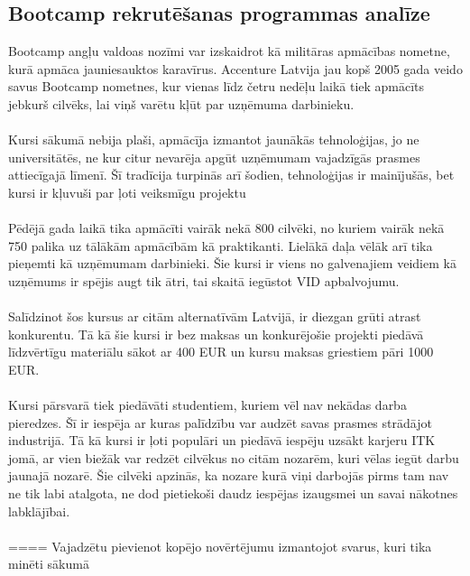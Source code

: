 \subsection{Bootcamp rekrutēšanas programmas analīze}
\justifying
Bootcamp angļu valdoas nozīmi var izskaidrot kā militāras apmācības nometne, kurā apmāca jauniesauktos
karavīrus. Accenture Latvija jau kopš 2005 gada veido savus Bootcamp nometnes, kur vienas līdz četru 
nedēļu laikā tiek apmācīts jebkurš cilvēks, lai viņš varētu kļūt par uzņēmuma darbinieku.
\paragraph{}
Kursi sākumā nebija plaši, apmācīja izmantot jaunākās tehnoloģijas, jo ne universitātēs, ne kur citur
nevarēja apgūt uzņēmumam vajadzīgās prasmes attiecīgajā līmenī. Šī tradīcija turpinās arī šodien,
tehnoloģijas ir mainījušās, bet kursi ir kļuvuši par ļoti veiksmīgu projektu
\paragraph{}
Pēdējā gada laikā tika apmācīti vairāk nekā 800 cilvēki, no kuriem vairāk nekā 750 palika uz tālākām
apmācībām kā praktikanti. Lielākā daļa vēlāk arī tika pieņemti kā uzņēmumam darbinieki. Šie kursi ir
viens no galvenajiem veidiem kā uzņēmums ir spējis augt tik ātri, tai skaitā iegūstot VID apbalvojumu.
\paragraph{}
Salīdzinot šos kursus ar citām alternatīvām Latvijā, ir diezgan grūti atrast konkurentu. Tā kā šie kursi
ir bez maksas un konkurējošie projekti piedāvā līdzvērtīgu materiālu sākot ar 400 EUR un kursu maksas
griestiem pāri 1000 EUR. 
\paragraph{}
Kursi pārsvarā tiek piedāvāti studentiem, kuriem vēl nav nekādas darba pieredzes. Šī ir iespēja
ar kuras palīdzību var audzēt savas prasmes strādājot industrijā. Tā kā kursi ir ļoti populāri un piedāvā
iespēju uzsākt karjeru ITK jomā, ar vien biežāk var redzēt cilvēkus no citām nozarēm, kuri vēlas iegūt
darbu jaunajā nozarē. Šie cilvēki apzinās, ka nozare kurā viņi darbojās pirms tam nav ne tik labi atalgota,
ne dod pietiekoši daudz iespējas izaugsmei un savai nākotnes labklājībai.
\paragraph{}
==== Vajadzētu pievienot kopējo novērtējumu izmantojot svarus, kuri tika minēti sākumā

